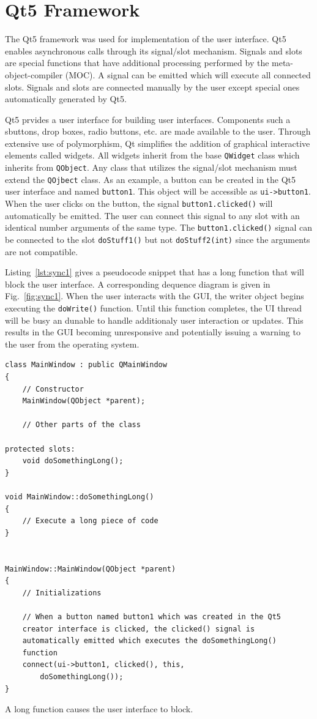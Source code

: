 \section{Qt5 Framework}\label{sec:qt}
The Qt5 framework was used for implementation of the user interface. Qt5 enables asynchronous calls through its signal/slot mechanism. Signals and slots are special functions that have additional processing performed by the meta-object-compiler (MOC). A signal can be emitted which will execute all connected slots. Signals and slots are connected manually by the user except special ones automatically generated by Qt5. 

Qt5 prvides a user interface for building user interfaces. Components such a sbuttons, drop boxes, radio buttons, etc. are made available to the user. Through extensive use of polymorphism, Qt simplifies the addition of graphical interactive elements called widgets. All widgets inherit from the base \texttt{QWidget} class which inherits from \texttt{QObject}. Any class that utilizes the signal/slot mechanism must extend the \texttt{QOjbect} class. As an example, a button can be created in the Qt5 user interface and named \texttt{button1}. This object will be accessible as \texttt{ui->button1}. When the user clicks on the button, the signal \texttt{button1.clicked()} will automatically be emitted. The user can connect this signal to any slot with an identical number arguments of the same type. The \texttt{button1.clicked()} signal can be connected to the slot \texttt{doStuff1()} but not \texttt{doStuff2(int)} since the arguments are not compatible.

Listing~\ref{lst:sync1} gives a pseudocode snippet that has a long function that will block the user interface. A corresponding dequence diagram is given in Fig.~\ref{fig:sync1}. When the user interacts with the GUI, the writer object begins executing the \texttt{doWrite()} function. Until this function completes, the UI thread will be busy an dunable to handle additionaly user interaction or updates. This results in the GUI becoming unresponsive and potentially issuing a warning to the user from the operating system.

\begin{listing}
\begin{verbatim}
class MainWindow : public QMainWindow
{
	// Constructor
	MainWindow(QObject *parent);
	
	// Other parts of the class
	
protected slots:
	void doSomethingLong();
}

void MainWindow::doSomethingLong()
{
	// Execute a long piece of code
}
	

MainWindow::MainWindow(QObject *parent)
{
	// Initializations
	
	// When a button named button1 which was created in the Qt5
	creator interface is clicked, the clicked() signal is 
	automatically emitted which executes the doSomethingLong()
	function
	connect(ui->button1, clicked(), this, 
		doSomethingLong());
}
\end{verbatim}
\caption{A long function causes the user interface to block.}\label{lst:sync1}
\end{listing}

